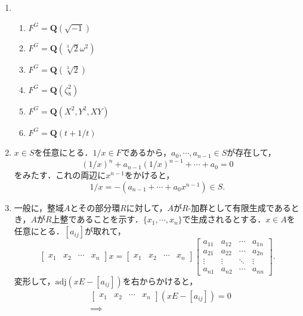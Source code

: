 \documentclass[a4paper,10pt]{ltjsarticle}
\begin{document}
\begin{enumerate}[]
  \item \label{enshu:1.41} \ 
  \begin{enumerate}
    \item \label{enshu:1.41.1} $F ^ G = \mathbf{Q}(\sqrt{-1})$
    \item \label{enshu:1.41.2} $F ^ G = \mathbf{Q}(\sqrt[3]{2} \omega ^ 2)$
    \item \label{enshu:1.41.3} $F ^ G = \mathbf{Q}(\sqrt[3]{2})$
    \item \label{enshu:1.41.4} $F ^ G = \mathbf{Q}(\zeta_8 ^ 2)$
    \item \label{enshu:1.41.5} $F ^ G = \mathbf{Q} (X ^ 2, Y ^ 2, XY)$
    \item \label{enshu:1.41.6} $F ^ G = \mathbf{Q} (t + 1 / t)$ 
  \end{enumerate}
  \item \label{enshu:1.42} $x \in S$を任意にとる．$1 / x \in F$であるから，$a_0, \cdots , a_{n - 1} \in S$が存在して，
  \[ (1 / x) ^ n + a_{n - 1}(1 / x) ^ {n - 1} + \cdots + a_0 = 0  \]
  をみたす．これの両辺に$x ^ {n - 1}$をかけると，
  \[ 1 / x = -(a_{n - 1} + \cdots + a_0x ^ {n - 1}) \in S. \]
  \item \label{enshu:1.43} 一般に，整域$A$とその部分環$R$に対して，$A$が$R$-加群として有限生成であるとき，$A$が$R$上整であることを示す．$\{x_1, \cdots, x_n\}$で生成されるとする．$x \in A$を任意にとる．$[a_{ij}]$が取れて，
  \begin{equation*}
    \begin{bmatrix}
      x_1 & x_2 & \cdots & x_n
    \end{bmatrix}
    x = \begin{bmatrix}
      x_1 & x_2 & \cdots & x_n
    \end{bmatrix}
    \begin{bmatrix}
      a_{11} & a_{12} & \cdots & a_{1n} \\
      a_{21} & a_{22} & \cdots & a_{2n} \\
      \vdots & \vdots & \ddots & \vdots \\
      a_{n1} & a_{n2} & \cdots & a_{nn}
    \end{bmatrix}.
  \end{equation*}
  変形して，$\mathrm{adj}(xE-[a_{ij}])$を右からかけると，
  \begin{align*}
    &\begin{bmatrix}
      x_1 & x_2 & \cdots & x_n
    \end{bmatrix}
    (xE - [a_{ij}]) = 0 \\
    &\implies

\end{align*}
\end{enumerate}
\end{document}
